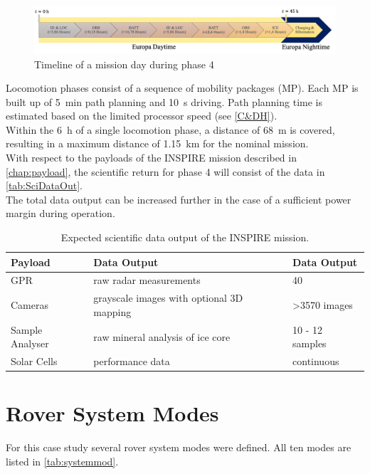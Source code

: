\begin{figure}[htb]
  \includegraphics[width=1.0\textwidth]{Media/Timeline_day.png}
  \caption{Timeline of a mission day during phase 4}
  \label{fig:timeline-day}
\end{figure}


Locomotion phases consist of a sequence of mobility packages (MP). Each MP is built up of 5~min path planning and 10~s driving. Path planning time is estimated based on the limited processor speed (see \autoref{C&DH}). \\
Within the 6~h of a single locomotion phase, a distance of 68~m is covered, resulting in a maximum distance of 1.15~km for the nominal mission.  \\

With respect to the payloads of the INSPIRE mission described in \autoref{chap:payload}, the scientific return for phase 4 will consist of the data in \autoref{tab:SciDataOut}. \\
The total data output can be increased further in the case of a sufficient power margin during operation.

\begin{table}[h]
\centering
\caption{Expected scientific data output of the INSPIRE mission.}
\begin{tabular}{lll}
\toprule
Payload         & Data Output                               & Data Output     \\ 
\midrule
GPR             & raw radar measurements                    & 40              \\
Cameras         & grayscale images with optional 3D mapping & >3570 images     \\
Sample Analyser & raw mineral analysis of ice core          & 10 - 12 samples \\
Solar Cells     & performance data                          & continuous      \\ 
\bottomrule
\end{tabular}
\label{tab:SciDataOut}
\end{table}

  
\section{Rover System Modes}
\label{chap:rovsubmod}
For this case study several rover system modes were defined. All ten modes are listed in \autoref{tab:systemmod}. 

